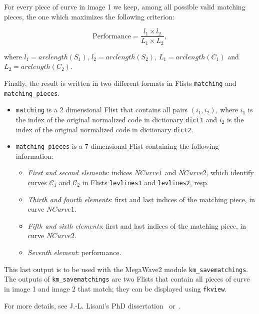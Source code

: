 For every piece of curve in image 1 we keep, among all possible valid
matching pieces, the one which maximizes the following criterion:

$$\mbox{Performance} = \frac{l_1 \times l_2}{L_1 \times L_2},$$

where $l_1=arclength(S_1)$, $l_2=arclength(S_2)$, $L_1=arclength(C_1)$
and $L_2=arclength(C_2)$.

Finally, the result is written in two different formats in Flists
\verb+matching+ and \verb+matching_pieces+. 

\begin{itemize}

\item \verb+matching+ is a 2 dimensional Flist that contains all pairs
$(i_1,i_2)$, where $i_1$ is the index of the original normalized code
in dictionary \verb+dict1+ and $i_2$ is the index of the original
normalized code in dictionary \verb+dict2+.

\item \verb+matching_pieces+ is a 7 dimensional Flist containing the following information:

  \begin{itemize}

  \item {\em First and second elements}: indices $NCurve1$ and
    $NCurve2$, which identify curves ${\mathcal C}_1$ and ${\mathcal C}_2$
    in Flists \verb+levlines1+ and \verb+levlines2+, resp.
  
  \item {\em Thirth and fourth elements}: first and last indices of the
    matching piece, in curve $NCurve1$.

  \item {\em Fifth and sixth elements}: first and last indices of the
    matching piece, in curve $NCurve2$.

  \item {\em Seventh element}: performance.
    
  \end{itemize}

\end{itemize}

This last output is to be used with the MegaWave2
module \verb+km_savematchings+. The
outputs of \verb+km_savematchings+ are two Flists that contain all pieces of
curve in image 1 and image 2 that match; they can be displayed using
\verb+fkview+.

\medskip

For more details, see J.-L. Lisani's PhD dissertation~\cite{lisani:comparaison} 
or~\cite{lisani.monasse.ea:on}.
